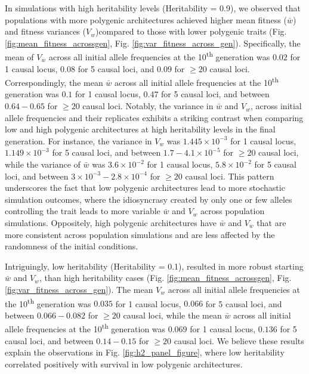 \documentclass{article}
\begin{document}
In simulations with high heritability levels (Heritability = 0.9), we observed that populations with more polygenic architectures achieved higher mean fitness ($\bar{w}$) and fitness variances ($V_w$)compared to those with lower polygenic traits (Fig. \ref{fig:mean_fitness_acrossgen}, Fig. \ref{fig:var_fitness_across_gen}). Specifically, the mean of $V_w$ across all initial allele frequencies at the 10\textsuperscript{th} generation was $0.02$ for 1 causal locus, $0.08$ for 5 causal loci, and $0.09$ for $\geq 20$ causal loci. Correspondingly, the mean $\bar{w}$ across all initial allele frequencies at the 10\textsuperscript{th} generation was $0.1$ for 1 causal locus, $0.47$ for 5 causal loci, and between $0.64- 0.65$ for $\geq 20$ causal loci. Notably, the variance in $\bar{w}$ and $V_w$, across initial allele frequencies and their replicates exhibits a striking contrast when comparing low and high polygenic architectures at high heritability levels in the final generation. For instance, the variance in $V_w$ was $1.445 \times 10^{-3}$ for 1 causal locus, $1.149 \times 10^{-3}$ for 5 causal loci, and between $1.7-4.1 \times 10^{-5}$ for $\geq 20$ causal loci, while the variance of $\bar{w}$ was $3.6 \times 10^{-2}$ for 1 causal locus, $5.8 \times 10^{-2}$ for 5 causal loci, and between $3 \times 10^{-3} - 2.8 \times 10^{-4}$ for $\geq 20$ causal loci. This pattern underscores the fact that low polygenic architectures lead to more stochastic simulation outcomes, where the idiosyncrasy created by only one or few alleles controlling the trait leads to more variable $\bar{w}$ and $V_w$ across population simulations. Oppositely, high polygenic architectures have $\bar{w}$ and $V_w$ that are more consistent across population simulations and are less affected by the randomness of the initial conditions.

Intriguingly, low heritability (Heritability = 0.1), resulted in more robust starting $\bar{w}$ and $V_w$, than high heritability cases (Fig. \ref{fig:mean_fitness_acrossgen}, Fig. \ref{fig:var_fitness_across_gen}). The mean $V_w$ across all initial allele frequencies at the 10\textsuperscript{th} generation was $0.035$ for 1 causal locus, $0.066$ for 5 causal loci, and between $0.066-0.082$ for $\geq 20$ causal loci, while the mean $\bar{w}$ across all initial allele frequencies at the 10\textsuperscript{th} generation was $0.069$ for 1 causal locus, $0.136$ for 5 causal loci, and between $0.14-0.15$ for $\geq 20$ causal loci. We believe these results explain the observations in Fig. \ref{fig:h2_panel_figure}, where low heritability correlated positively with survival in low polygenic architectures. 
\end{document}
